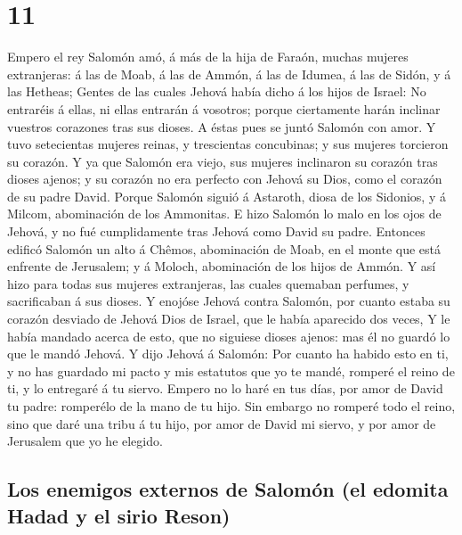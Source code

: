 \hypertarget{section-11-11}{%
\section{11}\label{section-11-11}}

 Empero el rey Salomón amó, á más de la hija de Faraón,
muchas mujeres extranjeras: á las de Moab, á las de Ammón, á las de
Idumea, á las de Sidón, y á las Hetheas;  Gentes de las
cuales Jehová había dicho á los hijos de Israel: No entraréis á ellas,
ni ellas entrarán á vosotros; porque ciertamente harán inclinar vuestros
corazones tras sus dioses. A éstas pues se juntó Salomón con amor.
 Y tuvo setecientas mujeres reinas, y trescientas
concubinas; y sus mujeres torcieron su corazón.  Y ya que
Salomón era viejo, sus mujeres inclinaron su corazón tras dioses ajenos;
y su corazón no era perfecto con Jehová su Dios, como el corazón de su
padre David.  Porque Salomón siguió á Astaroth, diosa de
los Sidonios, y á Milcom, abominación de los Ammonitas.  E
hizo Salomón lo malo en los ojos de Jehová, y no fué cumplidamente tras
Jehová como David su padre.  Entonces edificó Salomón un
alto á Chêmos, abominación de Moab, en el monte que está enfrente de
Jerusalem; y á Moloch, abominación de los hijos de Ammón. 
Y así hizo para todas sus mujeres extranjeras, las cuales quemaban
perfumes, y sacrificaban á sus dioses.  Y enojóse Jehová
contra Salomón, por cuanto estaba su corazón desviado de Jehová Dios de
Israel, que le había aparecido dos veces,  Y le había
mandado acerca de esto, que no siguiese dioses ajenos: mas él no guardó
lo que le mandó Jehová.  Y dijo Jehová á Salomón: Por
cuanto ha habido esto en ti, y no has guardado mi pacto y mis estatutos
que yo te mandé, romperé el reino de ti, y lo entregaré á tu siervo.
 Empero no lo haré en tus días, por amor de David tu
padre: romperélo de la mano de tu hijo.  Sin embargo no
romperé todo el reino, sino que daré una tribu á tu hijo, por amor de
David mi siervo, y por amor de Jerusalem que yo he elegido.

\hypertarget{los-enemigos-externos-de-salomuxf3n-el-edomita-hadad-y-el-sirio-reson}{%
\subsection{Los enemigos externos de Salomón (el edomita Hadad y el
sirio
Reson)}\label{los-enemigos-externos-de-salomuxf3n-el-edomita-hadad-y-el-sirio-reson}}

